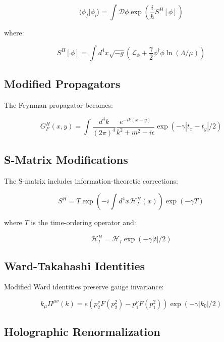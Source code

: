 \documentclass[12pt]{article}
\theoremstyle{plain}
\theoremstyle{definition}
\theoremstyle{remark}
\begin{document}
\begin{equation}
\langle \phi_f | \phi_i \rangle = \int \mathcal{D}\phi \exp\left(\frac{i}{\hbar}S^H[\phi]\right)
\end{equation}

where:

\begin{equation}
S^H[\phi] = \int d^4x \sqrt{-g} \left(\mathcal{L}_{\phi} + \frac{\gamma}{2}\phi^{\dagger}\phi\ln(\Lambda/\mu)\right)
\end{equation}

\subsection{Modified Propagators}

The Feynman propagator becomes:

\begin{equation}
G_F^H(x,y) = \int \frac{d^4k}{(2\pi)^4} \frac{e^{-ik(x-y)}}{k^2 + m^2 - i\epsilon} \exp(-\gamma|t_x-t_y|/2)
\end{equation}

\subsection{S-Matrix Modifications}

The S-matrix includes information-theoretic corrections:

\begin{equation}
S^H = T\exp\left(-i\int d^4x \mathcal{H}_I^H(x)\right)\exp(-\gamma T)
\end{equation}

where $T$ is the time-ordering operator and:

\begin{equation}
\mathcal{H}_I^H = \mathcal{H}_I\exp(-\gamma|t|/2)
\end{equation}

\subsection{Ward-Takahashi Identities}

Modified Ward identities preserve gauge invariance:

\begin{equation}
k_{\mu}\Pi^{\mu\nu}(k) = e\left(p_2^{\nu}F(p_2^2) - p_1^{\nu}F(p_1^2)\right)\exp(-\gamma|k_0|/2)
\end{equation}

\subsection{Holographic Renormalization}
\end{document}
